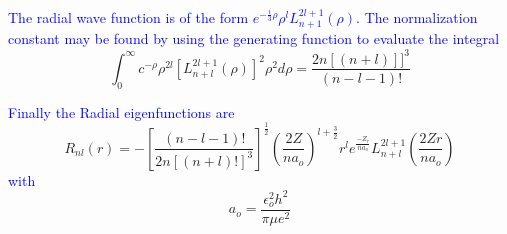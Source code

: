 \documentclass{article}
\begin{document}
\textcolor{blue}{The radial wave function is of the form $e^{-\frac{i}{3} \rho} \rho^{l} L_{n+1}^{2 l+1}(\rho)$. The normalization constant may be found by using the generating function to evaluate the integral}
\begin{equation}
    \int_{0}^{\infty} c^{-\rho} \rho^{2 l}\left[L_{n+l}^{2 l+1}(\rho)\right]^{2} \rho^{2} d \rho=\frac{2 n[(n+l)]]^{3}}{(n-l-1) !}
\end{equation}

\textcolor{blue}{Finally the Radial eigenfunctions are}
\begin{equation}
    R_{n l}(r)=-\left[\frac{(n-l-1) !}{2 n[(n+l) !]^{3}}\right]^{\frac{1}{2}}\left(\frac{2 Z}{n a_{o}}\right)^{l+\frac{3}{2}} r^{l} e^{\frac{-Z_{r}}{n a_{o}}} L_{n+l}^{2 l+1}\left(\frac{2 Z r}{n a_{o}}\right)
\end{equation}
 \textcolor{blue}{with}
 \begin{equation}
     a_{o}=\frac{\epsilon_{o}^{2} h^{2}}{\pi \mu e^{2}}
 \end{equation}
 
\end{document}
